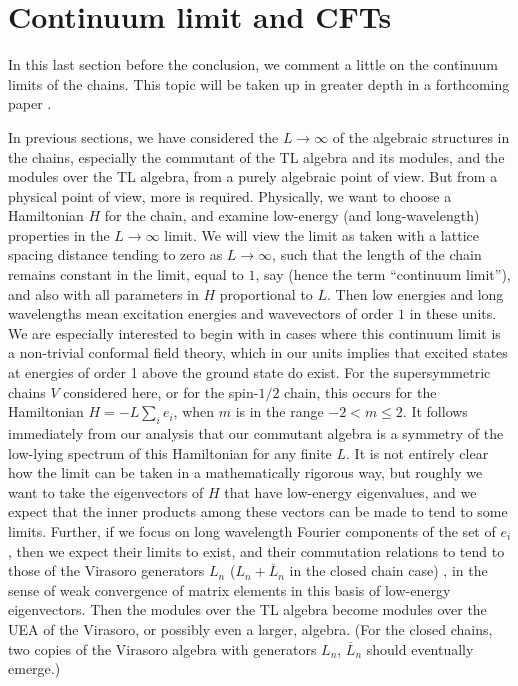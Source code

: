 \documentclass[twocolumn,floats,pra]{revtex4}
\begin{document}

\section{Continuum limit and CFTs}
\label{cont}

In this last section before the conclusion, we comment a little on
the continuum limits of the chains. This topic will be taken up in
greater depth in a forthcoming paper \cite{rs3}.

In previous sections, we have considered the $L\to\infty$ of the
algebraic structures in the chains, especially the commutant of
the TL algebra and its modules, and the modules over the TL
algebra, from a purely algebraic point of view. But from a
physical point of view, more is required. Physically, we want to
choose a Hamiltonian $H$ for the chain, and examine low-energy
(and long-wavelength) properties in the $L\to\infty$ limit. We
will view the limit as taken with a lattice spacing distance
tending to zero as $L\to\infty$, such that the length of the chain
remains constant in the limit, equal to $1$, say (hence the term
``continuum limit''), and also with all parameters in $H$
proportional to $L$. Then low energies and long wavelengths mean
excitation energies and wavevectors of order $1$ in these units.
We are especially interested to begin with in cases where this
continuum limit is a non-trivial conformal field theory, which in
our units implies that excited states at energies of order 1 above
the ground state do exist. For the supersymmetric chains $V$
considered here, or for the spin-$1/2$ chain, this occurs for the
Hamiltonian $H=-L\sum_i e_i$, when $m$ is in the range $-2<m\leq
2$. It follows immediately from our analysis that our commutant
algebra is a symmetry of the low-lying spectrum of this
Hamiltonian for any finite $L$. It is not entirely clear how the
limit can be taken in a mathematically rigorous way, but roughly
we want to take the eigenvectors of $H$ that have low-energy
eigenvalues, and we expect that the inner products among these
vectors can be made to tend to some limits. Further, if we focus
on long wavelength Fourier components of the set of $e_i$, then we
expect their limits to exist, and their commutation relations to
tend to those of the Virasoro generators $L_n$
($L_n+\overline{L}{_n}$ in the closed chain case) \cite{ks}, in
the sense of weak convergence of matrix elements in this basis of
low-energy eigenvectors. Then the modules over the TL algebra
become modules over the UEA of the Virasoro, or possibly even a
larger, algebra. (For the closed chains, two copies of the
Virasoro algebra with generators $L_n$, $\overline{L}_n$ should
eventually emerge.)
\end{document}
